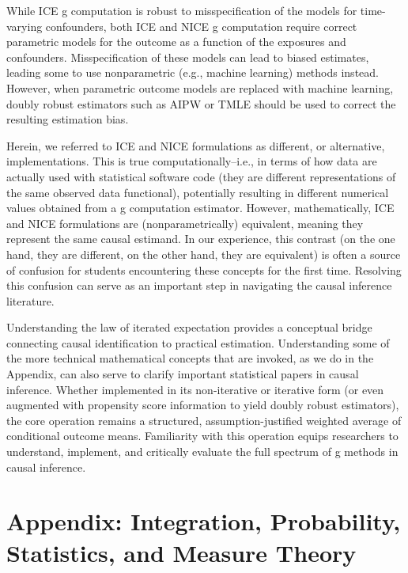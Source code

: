 \documentclass[12pt]{article}
\numberwithin{equation}{section}
\begin{document}
While ICE g computation is robust to misspecification of the models for time-varying confounders, both ICE and NICE g computation require correct parametric models for the outcome as a function of the exposures and confounders. Misspecification of these models can lead to biased estimates, leading some to use nonparametric (e.g., machine learning) methods instead. However, when parametric outcome models are replaced with machine learning, doubly robust estimators such as AIPW or TMLE should be used to correct the resulting estimation bias.\cite{Diaz2020}

Herein, we referred to ICE and NICE formulations as different, or alternative, implementations. This is true computationally--i.e., in terms of how data are actually used with statistical software code (they are different representations of the same observed data functional), potentially resulting in different numerical values obtained from a g computation estimator. However, mathematically, ICE and NICE formulations are (nonparametrically) equivalent, meaning they represent the same causal estimand. In our experience, this contrast (on the one hand, they are different, on the other hand, they are equivalent) is often a source of confusion for students encountering these concepts for the first time. Resolving this confusion can serve as an important step in navigating the causal inference literature.

Understanding the law of iterated expectation provides a conceptual bridge connecting causal identification to practical estimation. Understanding some of the more technical mathematical concepts that are invoked, as we do in the Appendix, can also serve to clarify important statistical papers in causal inference. Whether implemented in its non-iterative or iterative form (or even augmented with propensity score information to yield doubly robust estimators), the core operation remains a structured, assumption-justified weighted average of conditional outcome means. Familiarity with this operation equips researchers to understand, implement, and critically evaluate the full spectrum of g methods in causal inference.

\newpage




\newpage

\section*{Appendix: Integration, Probability, Statistics, and Measure Theory}
\end{document}
